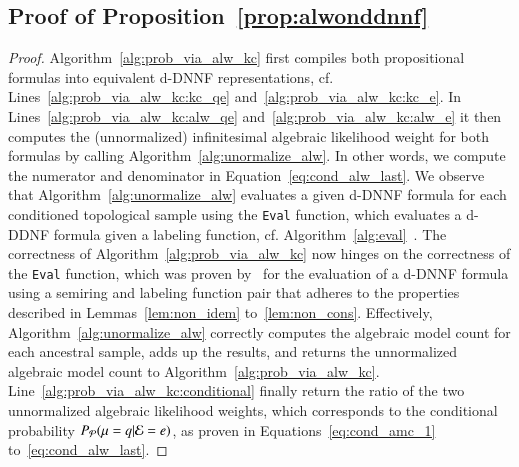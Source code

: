 \subsection{Proof of Proposition~\ref{prop:alwonddnnf}}
\label{app:proof:alwonddnnf}

\alwonddnnf*
\begin{proof}
    Algorithm~\ref{alg:prob_via_alw_kc} first compiles both propositional formulas into equivalent d-DNNF representations, cf. Lines~\ref{alg:prob_via_alw_kc:kc_qe} and~\ref{alg:prob_via_alw_kc:kc_e}.
    In Lines~\ref{alg:prob_via_alw_kc:alw_qe} and~\ref{alg:prob_via_alw_kc:alw_e} it then computes the (unnormalized) infinitesimal algebraic likelihood weight for both formulas by calling Algorithm~\ref{alg:unormalize_alw}. In other words, we compute the numerator and denominator in Equation~\ref{eq:cond_alw_last}. We observe that Algorithm~\ref{alg:unormalize_alw} evaluates a given d-DNNF formula for each conditioned topological sample using the \texttt{Eval} function, which evaluates a d-DDNF formula given a labeling function, cf. Algorithm~\ref{alg:eval}~\citep{kimmig2017algebraic}. The correctness of Algorithm~\ref{alg:prob_via_alw_kc} now hinges on the correctness of the \texttt{Eval} function, which was proven by~\citet{kimmig2017algebraic} for the evaluation of a d-DNNF formula using a semiring and labeling function pair that adheres to the properties described in Lemmas~\ref{lem:non_idem} to~\ref{lem:non_cons}. Effectively, Algorithm~\ref{alg:unormalize_alw} correctly computes the algebraic model count for each ancestral sample, adds up the results, and returns the unnormalized algebraic model count to Algorithm~\ref{alg:prob_via_alw_kc}. Line~\ref{alg:prob_via_alw_kc:conditional} finally return the ratio of the two unnormalized algebraic likelihood weights, which corresponds to the conditional probability $P_\mathcal{P}(\mu=q|\mathcal{E}=e)$, as proven in Equations~\ref{eq:cond_amc_1} to~\ref{eq:cond_alw_last}.
\end{proof}
